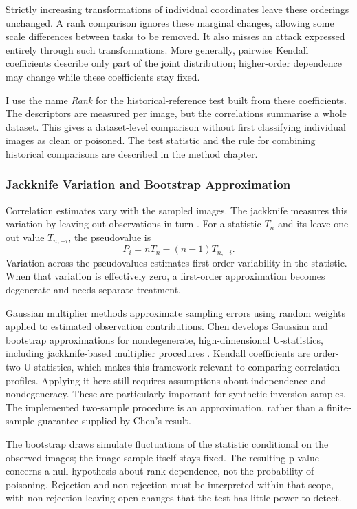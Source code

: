 Strictly increasing transformations of individual coordinates leave these
orderings unchanged. A rank comparison ignores these marginal changes,
allowing some scale differences between tasks to be removed. It also misses
an attack expressed entirely through such transformations. More generally,
pairwise Kendall coefficients describe only part of the joint distribution;
higher-order dependence may change while these coefficients stay fixed.

I use the name \emph{Rank} for the historical-reference test built from
these coefficients. The descriptors are measured per image, but the
correlations summarise a whole dataset. This gives a dataset-level
comparison without first classifying individual images as clean or
poisoned. The test statistic and the rule for combining historical
comparisons are described in the method chapter.

\subsubsection{Jackknife Variation and Bootstrap Approximation}

Correlation estimates vary with the sampled images. The jackknife measures
this variation by leaving out observations in turn
\cite{efron1981jackknife}. For a statistic $T_n$
and its leave-one-out value $T_{n,-i}$, the pseudovalue is
\begin{equation}
 P_i=nT_n-(n-1)T_{n,-i}.
 \label{eq:bg-jackknife}
\end{equation}
Variation across the pseudovalues estimates first-order variability in the
statistic. When that variation is effectively zero, a first-order
approximation becomes degenerate and needs separate treatment.

Gaussian multiplier methods approximate sampling errors using random
weights applied to estimated observation contributions. Chen develops
Gaussian and bootstrap approximations for nondegenerate, high-dimensional
U-statistics, including jackknife-based multiplier procedures
\cite{chen2018bootstrap}. Kendall coefficients are order-two U-statistics,
which makes this framework relevant to comparing correlation profiles.
Applying it here still requires assumptions about independence and
nondegeneracy. These are particularly important for synthetic inversion
samples. The implemented two-sample procedure is an approximation, rather
than a finite-sample guarantee supplied by Chen's result.

The bootstrap draws simulate fluctuations of the statistic conditional on
the observed images; the image sample itself stays fixed. The resulting
p-value concerns a null hypothesis about rank dependence, not the
probability of poisoning. Rejection and non-rejection must be interpreted
within that scope, with non-rejection leaving open changes that the test
has little power to detect.

